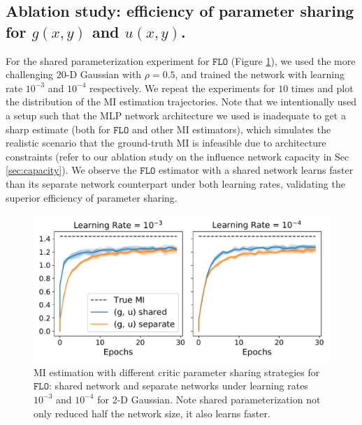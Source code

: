 \documentclass{article}
\theoremstyle{plain}
\theoremstyle{definition}
\theoremstyle{remark}
\newcommand{\FLO}{\texttt{FLO}}
\begin{document}
		\subsection{Ablation study: efficiency of parameter sharing for $g(x,y)$ and $u(x,y)$.} For the shared parameterization experiment for $\FLO$ (Figure \ref{fig:onefunc}), we used the more challenging $20$-D Gaussian with $\rho=0.5$, and trained the network with learning rate $10^{-3}$ and $10^{-4}$ respectively. We repeat the experiments for $10$ times and plot the distribution of the MI estimation trajectories. Note that we intentionally used a setup such that the MLP network architecture we used is inadequate to get a sharp estimate (both for $\FLO$ and other MI estimators), which simulates the realistic scenario that the ground-truth MI is infeasible due to architecture constraints (refer to our ablation study on the influence network capacity in Sec \ref{sec:capacity}). We observe the $\FLO$ estimator with a shared network learns faster than its separate network counterpart under both learning rates, validating the superior efficiency of parameter sharing. 
		
		
		\begin{figure}
			\centering
			\includegraphics[width=.7\textwidth]{figures/toy/OneFunc.pdf}
			\vspace{-1.em}
			\caption{MI estimation with different critic parameter sharing strategies for $\FLO$: shared network and separate networks under learning rates $10^{-3}$ and $10^{-4}$ for 2-D Gaussian. Note shared parameterization not only reduced half the network size, it also learns faster.}
			\label{fig:onefunc}
		\end{figure}
		
\end{document}
